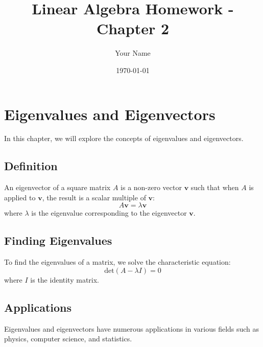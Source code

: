\documentclass{article}
\title{Linear Algebra Homework - Chapter 2}
\author{Your Name}
\date{\today}
\begin{document}
\maketitle

\section{Eigenvalues and Eigenvectors}
In this chapter, we will explore the concepts of eigenvalues and eigenvectors. 

\subsection{Definition}
An eigenvector of a square matrix \( A \) is a non-zero vector \( \mathbf{v} \) such that when \( A \) is applied to \( \mathbf{v} \), the result is a scalar multiple of \( \mathbf{v} \):
\[
A\mathbf{v} = \lambda \mathbf{v}
\]
where \( \lambda \) is the eigenvalue corresponding to the eigenvector \( \mathbf{v} \).

\subsection{Finding Eigenvalues}
To find the eigenvalues of a matrix, we solve the characteristic equation:
\[
\text{det}(A - \lambda I) = 0
\]
where \( I \) is the identity matrix.

\subsection{Applications}
Eigenvalues and eigenvectors have numerous applications in various fields such as physics, computer science, and statistics.
\end{document}
